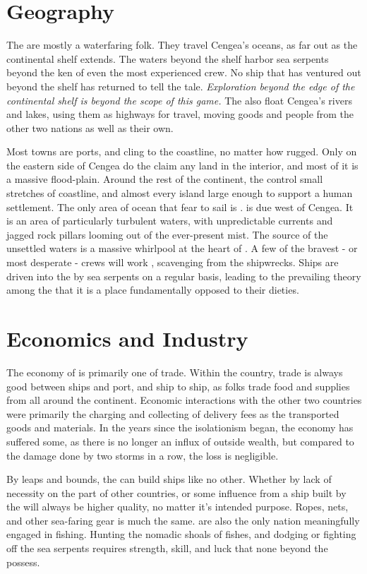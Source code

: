 \documentclass[blue]{GL2020}
\begin{document}
\section*{Geography}
The \pShip{} are mostly a waterfaring folk. They travel Cengea's oceans, as far out as the continental shelf extends. The waters beyond the shelf harbor sea serpents beyond the ken of even the most experienced \pShippies{} crew. No ship that has ventured out beyond the shelf has returned to tell the tale. \emph{Exploration beyond the edge of the continental shelf is beyond the scope of this game.} The \pShippies{} also float Cengea's rivers and lakes, using them as highways for travel, moving goods and people from the other two nations as well as their own.

Most \pShip{} towns are ports, and cling to the coastline, no matter how rugged. Only on the eastern side of Cengea do the \pShippies{} claim any land in the interior, and most of it is a massive flood-plain. Around the rest of the continent, the \pShip{} control small stretches of coastline, and almost every island large enough to support a human settlement. The only area of ocean that \pShippies{} fear to sail is \pWod{}. \pWod{} is due west of Cengea. It is an area of particularly turbulent waters, with unpredictable currents and jagged rock pillars looming out of the ever-present mist. The source of the unsettled waters is a massive whirlpool at the heart of \pWod{}. A few of the bravest - or most desperate - crews will work \pWod{}, scavenging from the shipwrecks. Ships are driven into the \pWod{} by sea serpents on a regular basis, leading to the prevailing theory among the \pShippies{} that it is a place fundamentally opposed to their dieties.

\section*{Economics and Industry}
The economy of \pShip{} is primarily one of trade. Within the country, trade is always good between ships and port, and ship to ship, as folks trade food and supplies from all around the continent. Economic interactions with the other two countries were primarily the charging and collecting of delivery fees as the \pShippies{} transported goods and materials. In the years since the isolationism began, the economy has suffered some, as there is no longer an influx of outside wealth, but compared to the damage done by two storms in a row, the loss is negligible.

By leaps and bounds, the \pShippies{} can build ships like no other. Whether by lack of necessity on the part of other countries, or some influence from \cEbbFull{} a ship built by the \pShippies{} will always be higher quality, no matter it's intended purpose. Ropes, nets, and other sea-faring gear is much the same. \pShippies{} are also the only nation meaningfully engaged in fishing. Hunting the nomadic shoals of fishes, and dodging or fighting off the sea serpents requires strength, skill, and luck that none beyond the \pShippies{} possess.
\end{document}
